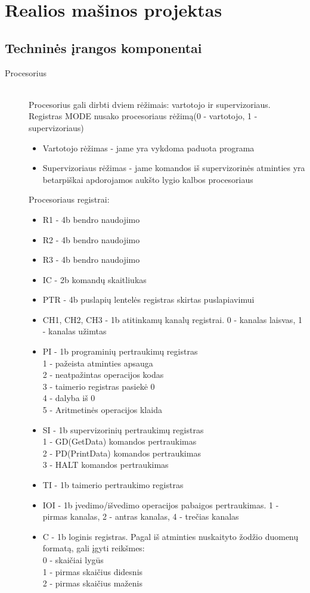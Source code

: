 \section{Realios mašinos projektas}

\subsection{Techninės įrangos komponentai}

\begin{description}
  \item[Procesorius]\leavevmode \\
Procesorius gali dirbti dviem rėžimais: vartotojo ir supervizoriaus. Registras MODE nusako procesoriaus rėžimą(0 - vartotojo, 1 - supervizoriaus)
\begin{itemize}
  \item Vartotojo rėžimas - jame yra vykdoma paduota programa
  \item Supervizoriaus rėžimas - jame komandos iš supervizorinės atminties yra betarpiškai apdorojamos aukšto lygio kalbos procesoriaus
\end{itemize}
Procesoriaus registrai:
\begin{itemize}
  \item R1 - 4b bendro naudojimo
  \item R2 - 4b bendro naudojimo
  \item R3 - 4b bendro naudojimo
  \item IC - 2b komandų skaitliukas
  \item PTR - 4b puslapių lentelės registras skirtas puslapiavimui
  \item CH1, CH2, CH3 - 1b atitinkamų kanalų registrai. 0 - kanalas laisvas, 1 - kanalas užimtas
  \item PI - 1b programinių pertraukimų registras\leavevmode
		\\1 - pažeista atminties apsauga
		\\2 - neatpažintas operacijos kodas
           	\\3 - taimerio registras pasiekė 0
		\\4 - dalyba iš 0
		\\5 - Aritmetinės operacijos klaida
  \item SI - 1b supervizorinių pertraukimų registras\leavevmode
		\\1 - GD(GetData) komandos pertraukimas
		\\2 - PD(PrintData) komandos pertraukimas
		\\3 - HALT komandos pertraukimas
  \item TI - 1b taimerio pertraukimo registras
  \item IOI - 1b įvedimo/išvedimo operacijos pabaigos pertraukimas. 1 - pirmas kanalas, 2 - antras kanalas, 4 - trečias kanalas
  \item C - 1b loginis registras. Pagal iš atminties nuskaityto žodžio duomenų formatą, gali įgyti reikšmes: \leavevmode
		\\ 0 - skaičiai lygūs
		\\ 1 - pirmas skaičius didesnis
		\\ 2 - pirmas skaičius maženis


\end{itemize}
\end{description}
